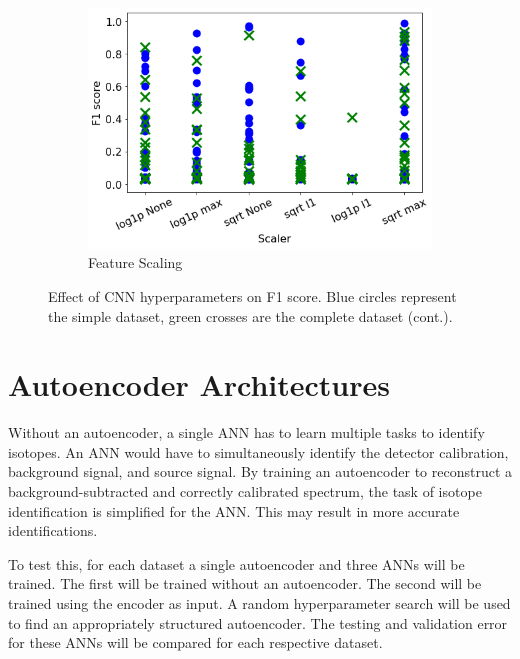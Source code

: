 \begin{figure} \ContinuedFloat
    \centering
    \begin{subfigure}[b]{0.49\textwidth}
        \centering
        \includegraphics[width=\textwidth]{images/cnn_scaler.png}
        \caption{Feature Scaling}
        \label{fig:cnn_scaler}
    \end{subfigure}

        \caption{Effect of CNN hyperparameters on F1 score. Blue circles represent the simple dataset, green crosses are the complete dataset (cont.).}
        \label{fig:cnn_hyperparameters_f1_score}
\end{figure}

\section{Autoencoder Architectures}

Without an autoencoder, a single ANN has to learn multiple tasks to identify isotopes. An ANN would have to simultaneously identify the detector calibration, background signal, and source signal. By training an autoencoder to reconstruct a background-subtracted and correctly calibrated spectrum, the task of isotope identification is simplified for the ANN. This may result in more accurate identifications. 




To test this, for each dataset a single autoencoder and three ANNs will be trained. The first will be trained without an autoencoder. The second will be trained using the encoder as input. A random hyperparameter search will be used to find an appropriately structured autoencoder. The testing and validation error for these ANNs will be compared for each respective dataset.


